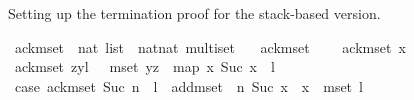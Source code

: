 \begin{isabellebody}
\begin{isamarkuptext}%
Setting up the termination proof for the stack-based version.%
\end{isamarkuptext}\isamarkuptrue%
\isamarkupfalse%
\ ack{\isacharunderscore}{\kern0pt}mset\ {\isacharcolon}{\kern0pt}{\isacharcolon}{\kern0pt}\ {\isachardoublequoteopen}nat\ list\ {\isasymRightarrow}\ {\isacharparenleft}{\kern0pt}nat{\isasymtimes}nat{\isacharparenright}{\kern0pt}\ multiset{\isachardoublequoteclose}\ \isanewline
\ \ {\isachardoublequoteopen}ack{\isacharunderscore}{\kern0pt}mset\ {\isacharbrackleft}{\kern0pt}{\isacharbrackright}{\kern0pt}\ {\isacharequal}{\kern0pt}\ {\isacharbraceleft}{\kern0pt}{\isacharhash}{\kern0pt}{\isacharbraceright}{\kern0pt}{\isachardoublequoteclose}\isanewline
{\isacharbar}{\kern0pt}\ {\isachardoublequoteopen}ack{\isacharunderscore}{\kern0pt}mset\ {\isacharbrackleft}{\kern0pt}x{\isacharbrackright}{\kern0pt}\ {\isacharequal}{\kern0pt}\ {\isacharbraceleft}{\kern0pt}{\isacharhash}{\kern0pt}{\isacharbraceright}{\kern0pt}{\isachardoublequoteclose}\isanewline
{\isacharbar}{\kern0pt}\ {\isachardoublequoteopen}ack{\isacharunderscore}{\kern0pt}mset\ {\isacharparenleft}{\kern0pt}z{\isacharhash}{\kern0pt}y{\isacharhash}{\kern0pt}l{\isacharparenright}{\kern0pt}\ {\isacharequal}{\kern0pt}\ \ mset\ {\isacharparenleft}{\kern0pt}{\isacharparenleft}{\kern0pt}y{\isacharcomma}{\kern0pt}z{\isacharparenright}{\kern0pt}\ {\isacharhash}{\kern0pt}\ map\ {\isacharparenleft}{\kern0pt}{\isasymlambda}x{\isachardot}{\kern0pt}\ {\isacharparenleft}{\kern0pt}Suc\ x{\isacharcomma}{\kern0pt}\ {}{\isacharparenright}{\kern0pt}{\isacharparenright}{\kern0pt}\ l{\isacharparenright}{\kern0pt}{\isachardoublequoteclose}\isanewline
\isanewline
{}\isamarkupfalse%
\ case{}{\isacharcolon}{\kern0pt}\ {\isachardoublequoteopen}ack{\isacharunderscore}{\kern0pt}mset\ {\isacharparenleft}{\kern0pt}Suc\ n\ {\isacharhash}{\kern0pt}\ l{\isacharparenright}{\kern0pt}\ {\isacharless}{\kern0pt}\ add{\isacharunderscore}{\kern0pt}mset\ {\isacharparenleft}{\kern0pt}{}{\isacharcomma}{\kern0pt}\ n{\isacharparenright}{\kern0pt}\ {\isacharbraceleft}{\kern0pt}{\isacharhash}{\kern0pt}{\isacharparenleft}{\kern0pt}Suc\ x{\isacharcomma}{\kern0pt}\ {}{\isacharparenright}{\kern0pt}{\isachardot}{\kern0pt}\ x\ {\isasymin}{\isacharhash}{\kern0pt}\ mset\ l{\isacharhash}{\kern0pt}{\isacharbraceright}{\kern0pt}{\isachardoublequoteclose}\isanewline
%
\isadelimproof
%
\endisadelimproof
%
\isatagproof
{}\isamarkupfalse%

\end{isabellebody}
